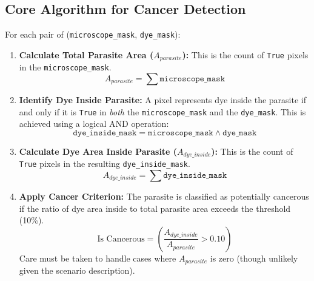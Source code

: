 \documentclass{article}
\begin{document}
\subsection{Core Algorithm for Cancer Detection}
For each pair of (\texttt{microscope\_mask}, \texttt{dye\_mask}):
\begin{enumerate}
    \item \textbf{Calculate Total Parasite Area ($A_{parasite}$):} This is the count of \texttt{True} pixels in the \texttt{microscope\_mask}.
        $$A_{parasite} = \sum \texttt{microscope\_mask}$$
    \item \textbf{Identify Dye Inside Parasite:} A pixel represents dye inside the parasite if and only if it is \texttt{True} in \textit{both} the \texttt{microscope\_mask} and the \texttt{dye\_mask}. This is achieved using a logical AND operation:
        $$\texttt{dye\_inside\_mask} = \texttt{microscope\_mask} \land \texttt{dye\_mask}$$
    \item \textbf{Calculate Dye Area Inside Parasite ($A_{dye\_inside}$):} This is the count of \texttt{True} pixels in the resulting \texttt{dye\_inside\_mask}.
        $$A_{dye\_inside} = \sum \texttt{dye\_inside\_mask}$$
    \item \textbf{Apply Cancer Criterion:} The parasite is classified as potentially cancerous if the ratio of dye area inside to total parasite area exceeds the threshold (10\%).
        $$\text{Is Cancerous} = \left( \frac{A_{dye\_inside}}{A_{parasite}} > 0.10 \right)$$
        Care must be taken to handle cases where $A_{parasite}$ is zero (though unlikely given the scenario description).
\end{enumerate}
\end{document}

